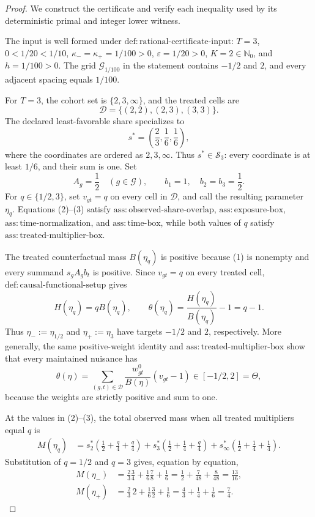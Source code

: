 \documentclass{article}
\begin{document}
\begin{proof}
We construct the certificate and verify each inequality used by its deterministic primal and integer lower witness.

The input is well formed under \(\mathrm{def{:}rational\text{-}certificate\text{-}input}\): \(T=3\), \(0<1/20<1/10\), \(\kappa_-=\kappa_+=1/100>0\), \(\varepsilon=1/20>0\), \(K=2\in\mathbb N_0\), and \(h=1/100>0\). The grid \(\mathcal G_{1/100}\) in the statement contains \(-1/2\) and \(2\), and every adjacent spacing equals \(1/100\).

For \(T=3\), the cohort set is \(\{2,3,\infty\}\), and the treated cells are
\[
 \mathcal D=\{(2,2),(2,3),(3,3)\}.
\tag{1}
\]
The declared least-favorable share specializes to
\[
 s^*=\left(\frac23,\frac16,\frac16\right),
\tag{2}
\]
where the coordinates are ordered as \(2,3,\infty\). Thus \(s^*\in\mathcal S_3\): every coordinate is at least \(1/6\), and their sum is one. Set
\[
 A_g=\frac12\quad(g\in\mathcal G),\qquad
 b_1=1,\quad b_2=b_3=\frac12.
\tag{3}
\]
For \(q\in\{1/2,3\}\), set \(v_{gt}=q\) on every cell in \(\mathcal D\), and call the resulting parameter \(\eta_q\). Equations (2)--(3) satisfy \(\mathrm{ass{:}observed\text{-}share\text{-}overlap}\), \(\mathrm{ass{:}exposure\text{-}box}\), \(\mathrm{ass{:}time\text{-}normalization}\), and \(\mathrm{ass{:}time\text{-}box}\), while both values of \(q\) satisfy \(\mathrm{ass{:}treated\text{-}multiplier\text{-}box}\).

The treated counterfactual mass \(B(\eta_q)\) is positive because (1) is nonempty and every summand \(s_gA_gb_t\) is positive. Since \(v_{gt}=q\) on every treated cell, \(\mathrm{def{:}causal\text{-}functional\text{-}setup}\) gives
\[
 H(\eta_q)=qB(\eta_q),\qquad
 \theta(\eta_q)=\frac{H(\eta_q)}{B(\eta_q)}-1=q-1.
\tag{4}
\]
Thus \(\eta_-:=\eta_{1/2}\) and \(\eta_+:=\eta_3\) have targets \(-1/2\) and \(2\), respectively. More generally, the same positive-weight identity and \(\mathrm{ass{:}treated\text{-}multiplier\text{-}box}\) show that every maintained nuisance has
\[
 \theta(\eta)=\sum_{(g,t)\in\mathcal D}
 \frac{w^0_{gt}}{B(\eta)}(v_{gt}-1)\in[-1/2,2]=\Theta,
\tag{5}
\]
because the weights are strictly positive and sum to one.

At the values in (2)--(3), the total observed mass when all treated multipliers equal \(q\) is
\[
 \begin{aligned}
 M(\eta_q)
 &=s^*_2\left(\frac12+\frac q4+\frac q4\right)
   +s^*_3\left(\frac12+\frac14+\frac q4\right)
   +s^*_{\infty}\left(\frac12+\frac14+\frac14\right).
 \end{aligned}
\tag{6}
\]
Substitution of \(q=1/2\) and \(q=3\) gives, equation by equation,
\[
 \begin{aligned}
 M(\eta_-)
 &=\frac23\frac34+\frac16\frac78+\frac16
 =\frac12+\frac7{48}+\frac8{48}=\frac{13}{16},\\
 M(\eta_+)
 &=\frac23\,2+\frac16\frac32+\frac16
 =\frac43+\frac14+\frac16=\frac74.
 \end{aligned}
\tag{7}
\]


\end{proof}
\end{document}
